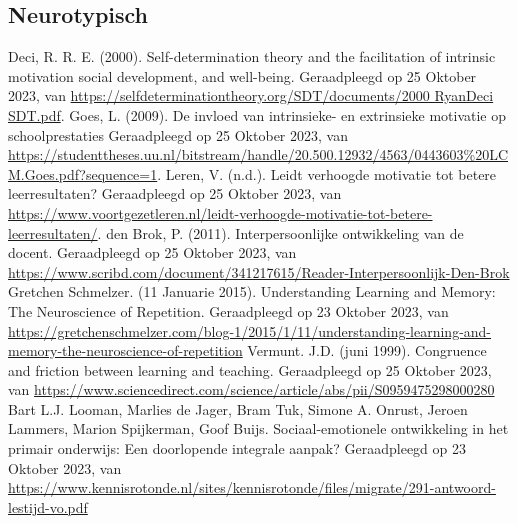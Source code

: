 \documentclass{article}
\begin{document}
    
    \pagestyle{empty}
    \renewcommand{\refname}{Literatuurlijst}
    \begin{thebibliography}{9}

        \item\subsection*{Neurotypisch}

                Deci, R. R. E. (2000). Self-determination theory and the facilitation of intrinsic motivation social development, and well-being. Geraadpleegd op 25 Oktober 2023, van \url{https://selfdeterminationtheory.org/SDT/documents/2000 RyanDeci SDT.pdf}.
                Goes, L. (2009). De invloed van intrinsieke- en extrinsieke motivatie op schoolprestaties Geraadpleegd op 25 Oktober 2023, van \url{https://studenttheses.uu.nl/bitstream/handle/20.500.12932/4563/0443603%20LCM.Goes.pdf?sequence=1}.
                Leren, V. (n.d.). Leidt verhoogde motivatie tot betere leerresultaten? Geraadpleegd op 25 Oktober 2023, van \url{https://www.voortgezetleren.nl/leidt-verhoogde-motivatie-tot-betere-leerresultaten/}.
                den Brok, P. (2011). Interpersoonlijke ontwikkeling van de docent. Geraadpleegd op 25 Oktober 2023, van \url{https://www.scribd.com/document/341217615/Reader-Interpersoonlijk-Den-Brok}
                Gretchen Schmelzer. (11 Januarie 2015). Understanding Learning and Memory: The Neuroscience of Repetition. Geraadpleegd op 23 Oktober 2023, van \url{https://gretchenschmelzer.com/blog-1/2015/1/11/understanding-learning-and-memory-the-neuroscience-of-repetition}
                Vermunt. J.D. (juni 1999). Congruence and friction between learning and teaching. Geraadpleegd op 25 Oktober 2023, van \url{https://www.sciencedirect.com/science/article/abs/pii/S0959475298000280}
                Bart L.J. Looman, Marlies de Jager, Bram Tuk, Simone A. Onrust, Jeroen Lammers, Marion Spijkerman, Goof Buijs. Sociaal-emotionele ontwikkeling in het primair onderwijs: Een doorlopende integrale aanpak? Geraadpleegd op 23 Oktober 2023, van \url{https://www.kennisrotonde.nl/sites/kennisrotonde/files/migrate/291-antwoord-lestijd-vo.pdf}

\end{thebibliography}
\end{document}
